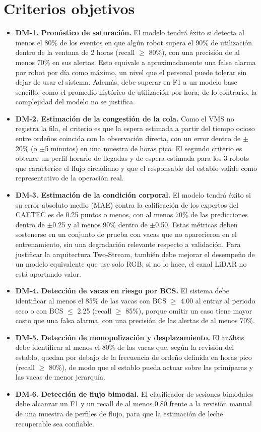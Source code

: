 \documentclass[11pt,letterpaper,DIV=12]{scrartcl}
\begin{document}


\section{Criterios objetivos}

\begin{itemize}
  \item \textbf{DM-1. Pronóstico de saturación.} El modelo tendrá éxito si detecta al menos el 80\% de los eventos en que algún robot supera el 90\% de utilización dentro de la ventana de 2 horas (recall $\geq$ 80\%), con una precisión de al menos 70\% en sus alertas. Esto equivale a aproximadamente una falsa alarma por robot por día como máximo, un nivel que el personal puede tolerar sin dejar de usar el sistema. Además, debe superar en F1 a un modelo base sencillo, como el promedio histórico de utilización por hora; de lo contrario, la complejidad del modelo no se justifica.
  \item \textbf{DM-2. Estimación de la congestión de la cola.} Como el VMS no registra la fila, el criterio es que la espera estimada a partir del tiempo ocioso entre ordeños coincida con la observación directa, con un error dentro de $\pm$20\% (o $\pm$5 minutos) en una muestra de horas pico. El segundo criterio es obtener un perfil horario de llegadas y de espera estimada para los 3 robots que caracterice el flujo circadiano y que el responsable del establo valide como representativo de la operación real.
  \item \textbf{DM-3. Estimación de la condición corporal.} El modelo tendrá éxito si su error absoluto medio (MAE) contra la calificación de los expertos del CAETEC es de 0.25 puntos o menos, con al menos 70\% de las predicciones dentro de $\pm$0.25 y al menos 90\% dentro de $\pm$0.50. Estas métricas deben sostenerse en un conjunto de prueba con vacas que no aparecieron en el entrenamiento, sin una degradación relevante respecto a validación. Para justificar la arquitectura Two-Stream, también debe mejorar el desempeño de un modelo equivalente que use solo RGB; si no lo hace, el canal LiDAR no está aportando valor.
  \item \textbf{DM-4. Detección de vacas en riesgo por BCS.} El sistema debe identificar al menos el 85\% de las vacas con BCS $\geq$ 4.00 al entrar al periodo seco o con BCS $\leq$ 2.25 (recall $\geq$ 85\%), porque omitir un caso tiene mayor costo que una falsa alarma, con una precisión de las alertas de al menos 70\%.
  \item \textbf{DM-5. Detección de monopolización y desplazamiento.} El análisis debe identificar al menos el 80\% de las vacas que, según la revisión del establo, quedan por debajo de la frecuencia de ordeño definida en horas pico (recall $\geq$ 80\%), de modo que el establo pueda actuar sobre las primíparas y las vacas de menor jerarquía.
  \item \textbf{DM-6. Detección de flujo bimodal.} El clasificador de sesiones bimodales debe alcanzar un F1 y un recall de al menos 0.80 frente a la revisión manual de una muestra de perfiles de flujo, para que la estimación de leche recuperable sea confiable.
\end{itemize}
\end{document}
